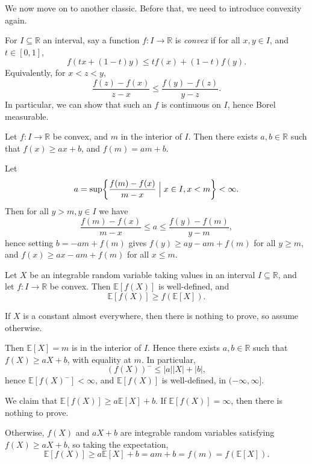 \documentclass[12pt]{article}
\begin{document}
We now move on to another classic. Before that, we need to introduce convexity again.

\begin{definition}
	For $I \subseteq \mathbb{R}$ an interval, say a function $f : I \to \mathbb{R}$ is \emph{convex} if for all $x, y \in I$, and $t \in [0,1]$,
	\[
	f(tx + (1-t)y) \leq t f(x) + (1-t)f(y).
	\]
	Equivalently, for $x < z < y$,
	\[
	\frac{f(z) - f(x)}{z - x} \leq \frac{f(y) - f(z)}{y - z}.
	\]
	In particular, we can show that such an $f$ is continuous on $I$, hence Borel measurable.
\end{definition}

\begin{lemma}
	Let $f : I \to \mathbb{R}$ be convex, and $m$ in the interior of $I$. Then there exists $a, b \in \mathbb{R}$ such that $f(x) \geq ax + b$, and $f(m) = am + b$.
\end{lemma}

\begin{proofbox}
	Let
	\[
		a = \sup \biggl\{ \frac{f(m) - f(x)}{m - x} \Bigm| x \in I, x < m \biggr\} < \infty.
	\]
	Then for all $y > m, y \in I$ we have
	\[
	\frac{f(m) - f(x)}{m - x} \leq a \leq \frac{f(y) - f(m)}{y - m},
	\]
	hence setting $b = -am + f(m)$ gives $f(y) \geq ay - am + f(m)$ for all $y \geq m$, and $f(x) \geq ax - am + f(m)$ for all $x \leq m$.
\end{proofbox}

\begin{theorem}
	Let $X$ be an integrable random variable taking values in an interval  $I \subseteq \mathbb{R}$, and let $f : I \to \mathbb{R}$ be convex. Then $\mathbb{E}[f(X)]$ is well-defined, and
	\[
	\mathbb{E}[f(X)] \geq f(\mathbb{E}[X]).
	\]
\end{theorem}

\begin{proofbox}
	If $X$ is a constant almost everywhere, then there is nothing to prove, so assume otherwise.

	Then $\mathbb{E}[X] = m$ is in the interior of $I$. Hence there exists $a, b \in \mathbb{R}$ such that $f(X) \geq aX + b$, with equality at $m$. In particular,
	\[
		(f(X))^{-} \leq |a||X|+|b|,
	\]
	hence $\mathbb{E}[f(X)^{-}] < \infty$, and $\mathbb{E}[f(X)]$ is well-defined, in $(-\infty, \infty]$.

	We claim that $\mathbb{E}[f(X)] \geq a \mathbb{E}[X] + b$. If $\mathbb{E}[f(X)] = \infty$, then there is nothing to prove.

	Otherwise, $f(X)$ and $aX + b$ are integrable random variables satisfying $f(X) \geq aX + b$, so taking the expectation,
	\[
	\mathbb{E}[f(X)] \geq a \mathbb{E}[X] + b = am + b = f(m) = f(\mathbb{E}[X]).
	\]
\end{proofbox}
\end{document}
